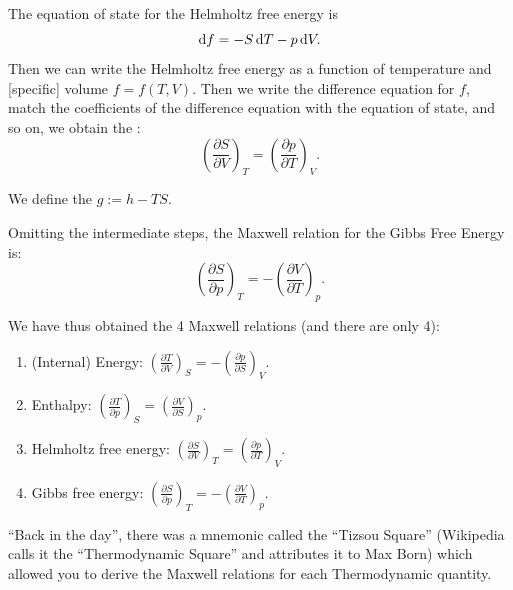 \begin{example}
The equation of state for the Helmholtz free energy is
\begin{equation}
\mathrm{d} f = - S\,\mathrm{d} T - p\,\mathrm{d} V.
\end{equation}
Then we can write the Helmholtz free energy as a function of
temperature and [specific] volume $f=f(T,V)$. Then we write the
difference equation for $f$, match the coefficients of the difference
equation with the equation of state, and so on, we obtain the
:
\begin{equation}\label{eq:maxwell-relation-for-helmholtz-free-energy}
\left(\frac{\partial S}{\partial V}\right)_{T}
=\left(\frac{\partial p}{\partial T}\right)_{V}.
\end{equation}
\end{example}

\begin{definition}
We define the  $g := h - TS$.
\end{definition}

\begin{example}
Omitting the intermediate steps, the Maxwell relation for the Gibbs
Free Energy is:
\begin{equation}\label{eq:maxwell-relation-for-gibbs-free-energy}
\left(\frac{\partial S}{\partial p}\right)_{T}
=-\left(\frac{\partial V}{\partial T}\right)_{p}.
\end{equation}
\end{example}

\begin{summary}
We have thus obtained the 4 Maxwell relations (and there are only 4):
\begin{enumerate}
\item (Internal) Energy: $\displaystyle{\left(\frac{\partial T}{\partial V}\right)_{S}=-\left(\frac{\partial p}{\partial S}\right)_{V}.}$
\item Enthalpy: $\displaystyle{\left(\frac{\partial T}{\partial p}\right)_{S} = \left(\frac{\partial V}{\partial S}\right)_{p}.}$
\item Helmholtz free energy: $\displaystyle{\left(\frac{\partial S}{\partial V}\right)_{T}=\left(\frac{\partial p}{\partial T}\right)_{V}.}$
\item Gibbs free energy: $\displaystyle{\left(\frac{\partial S}{\partial p}\right)_{T}
=-\left(\frac{\partial V}{\partial T}\right)_{p}.}$
\end{enumerate}
\end{summary}

\begin{remark}
``Back in the day'', there was a mnemonic called the ``Tizsou Square''
(Wikipedia calls it the ``Thermodynamic Square'' and attributes it to
Max Born) which allowed you to derive the Maxwell relations for each
Thermodynamic quantity.
\end{remark}